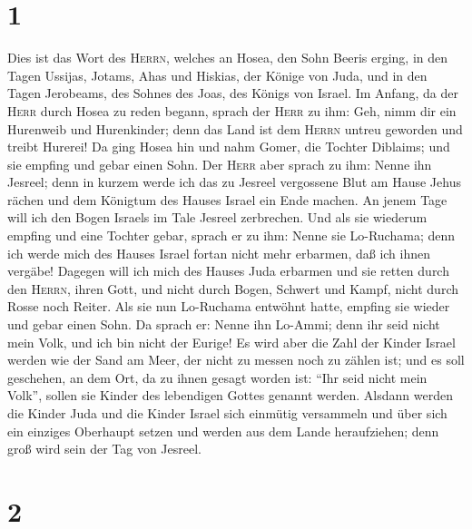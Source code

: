 \hypertarget{section}{%
\section{1}\label{section}}

 Dies ist das Wort des \textsc{Herrn}, welches an Hosea,
den Sohn Beeris erging, in den Tagen Ussijas, Jotams, Ahas und Hiskias,
der Könige von Juda, und in den Tagen Jerobeams, des Sohnes des Joas,
des Königs von Israel.  Im Anfang, da der \textsc{Herr}
durch Hosea zu reden begann, sprach der \textsc{Herr} zu ihm: Geh, nimm
dir ein Hurenweib und Hurenkinder; denn das Land ist dem \textsc{Herrn}
untreu geworden und treibt Hurerei!  Da ging Hosea hin und
nahm Gomer, die Tochter Diblaims; und sie empfing und gebar einen Sohn.
 Der \textsc{Herr} aber sprach zu ihm: Nenne ihn Jesreel;
denn in kurzem werde ich das zu Jesreel vergossene Blut am Hause Jehus
rächen und dem Königtum des Hauses Israel ein Ende machen.
 An jenem Tage will ich den Bogen Israels im Tale Jesreel
zerbrechen.  Und als sie wiederum empfing und eine Tochter
gebar, sprach er zu ihm: Nenne sie Lo-Ruchama; denn ich werde mich des
Hauses Israel fortan nicht mehr erbarmen, daß ich ihnen vergäbe!
 Dagegen will ich mich des Hauses Juda erbarmen und sie
retten durch den \textsc{Herrn}, ihren Gott, und nicht durch Bogen,
Schwert und Kampf, nicht durch Rosse noch Reiter.  Als sie
nun Lo-Ruchama entwöhnt hatte, empfing sie wieder und gebar einen Sohn.
 Da sprach er: Nenne ihn Lo-Ammi; denn ihr seid nicht mein
Volk, und ich bin nicht der Eurige!  Es wird aber die
Zahl der Kinder Israel werden wie der Sand am Meer, der nicht zu messen
noch zu zählen ist; und es soll geschehen, an dem Ort, da zu ihnen
gesagt worden ist: ``Ihr seid nicht mein Volk'', sollen sie Kinder des
lebendigen Gottes genannt werden.  Alsdann werden die
Kinder Juda und die Kinder Israel sich einmütig versammeln und über sich
ein einziges Oberhaupt setzen und werden aus dem Lande heraufziehen;
denn groß wird sein der Tag von Jesreel.

\hypertarget{section-1}{%
\section{2}\label{section-1}}

